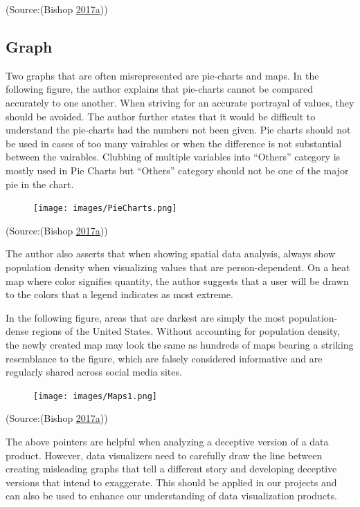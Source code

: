 \documentclass[]{book}
\begin{document}
(Source:(Bishop
\protect\hyperlink{ref-visual-lies}{2017}\protect\hyperlink{ref-visual-lies}{a}))

\subsection{Graph}\label{graph}

Two graphs that are often misrepresented are pie-charts and maps. In the
following figure, the author explains that pie-charts cannot be compared
accurately to one another. When striving for an accurate portrayal of
values, they should be avoided. The author further states that it would
be difficult to understand the pie-charts had the numbers not been
given. Pie charts should not be used in cases of too many vairables or
when the difference is not substantial between the vairables. Clubbing
of multiple variables into ``Others'' category is mostly used in Pie
Charts but ``Others'' category should not be one of the major pie in the
chart.

\begin{figure}
\centering
\texttt{[image: images/PieCharts.png]}
\caption{}
\end{figure}

(Source:(Bishop
\protect\hyperlink{ref-visual-lies}{2017}\protect\hyperlink{ref-visual-lies}{a}))

The author also asserts that when showing spatial data analysis, always
show population density when visualizing values that are
person-dependent. On a heat map where color signifies quantity, the
author suggests that a user will be drawn to the colors that a legend
indicates as most extreme.

In the following figure, areas that are darkest are simply the most
population-dense regions of the United States. Without accounting for
population density, the newly created map may look the same as hundreds
of maps bearing a striking resemblance to the figure, which are falsely
considered informative and are regularly shared across social media
sites.

\begin{figure}
\centering
\texttt{[image: images/Maps1.png]}
\caption{}
\end{figure}

(Source:(Bishop
\protect\hyperlink{ref-visual-lies}{2017}\protect\hyperlink{ref-visual-lies}{a}))

The above pointers are helpful when analyzing a deceptive version of a
data product. However, data visualizers need to carefully draw the line
between creating misleading graphs that tell a different story and
developing deceptive versions that intend to exaggerate. This should be
applied in our projects and can also be used to enhance our
understanding of data visualization products.
\end{document}
